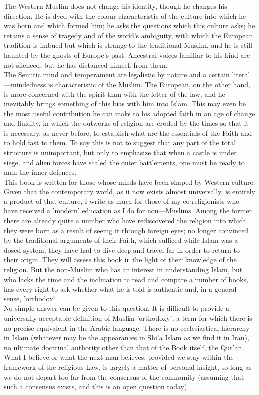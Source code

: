 \documentclass[11pt, b5paper, twoside]{book}
\begin{document}
The Western Muslim does not change his identity, though he changes his direction. He is dyed with the colour characteristic of the culture into which he was born and which formed him; he asks the questions which this culture asks; he retains a sense of tragedy and of the world's ambiguity, with which the European tradition is imbued but which is strange to the traditional Muslim, and he is still haunted by the ghosts of Europe's past. Ancestral voices familiar to his kind are not silenced, but he has distanced himself from them. \\

The Semitic mind and temperament are legalistic by nature and a certain literal---mindedness is characteristic of the Muslim. The European, on the other hand, is more concerned with the spirit than with the letter of the law, and he inevitably brings something of this bias with him into Islam. This may even be the most useful contribution he can make to his adopted faith in an age of change and fluidity, in which the outworks of religion are eroded by the times so that it is necessary, as never before, to establish what are the essentials of the Faith and to hold fast to them. To say this is not to suggest that any part of the total structure is unimportant, but only to emphasize that when a castle is under siege, and alien forces have scaled the outer battlements, one must be ready to man the inner defences. \\

This book is written for those whose minds have been shaped by Western culture. Given that the contemporary world, as it now exists almost universally, is entirely a product of that culture, I write as much for those of my co-religionists who have received a 'modern' education as I do for non---Muslims. Among the former there are already quite a number who have rediscovered the religion into which they were born as a result of seeing it through foreign eyes; no longer convinced by the traditional arguments of their Faith, which sufficed while Islam was a dosed system, they have had to dive deep and travel far in order to return to their origin. They will assess this book in the light of their knowledge of the religion. But the non-Muslim who has an interest in understanding Islam, but who lacks the time and the inclination to read and compare a number of books, has every right to ask whether what he is told is authentic and, in a general sense, 'orthodox'. \\

No simple answer can be given to this question. It is difficult to provide a universally acceptable definition of Muslim 'orthodoxy', a term for which there is no precise equivalent in the Arabic language. There is no ecclesiastical hierarchy in Islam (whatever may be the appearances in Shi'a Islam as we find it in Iran), no ultimate doctrinal authority other than that of the Book itself, the Qur'an. What I believe or what the next man believes, provided we stay within the framework of the religious Law, is largely a matter of personal insight, so long as we do not depart too far from the consensus of the community (assuming that such a consensus exists, and this is an open question today). \\
\end{document}
